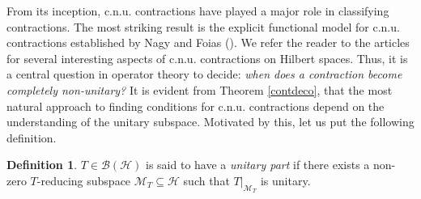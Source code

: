 \documentclass[12pt]{amsart}
\numberwithin{equation}{section}
\theoremstyle{definition}
\newtheorem*{defn*}{Definition}
\newcommand{\1}{{\mbox{\bf 1}}}
\newcommand{\clb}{\mathcal{B}}
\newcommand{\clh}{\mathcal{H}}
\newcommand{\clm}{\mathcal{M}}
\begin{document}
From its inception, c.n.u. contractions have played a major role in classifying contractions. The most striking result is the explicit functional model for c.n.u. contractions established by Nagy and Foias (\cite{NF}). We refer the reader to the articles \cite{Bercovici, BT, Das, Levan, MT, Wu} for several interesting aspects of c.n.u. contractions on Hilbert spaces.  Thus, it is a central question in operator theory to decide: \textit{when does a contraction become completely non-unitary?} It is evident from Theorem \ref{contdeco}, that the most natural approach to finding conditions for c.n.u. contractions depend on the understanding of the unitary subspace.  Motivated by this, let us put the following definition. 

\begin{defn*}
$T \in \clb(\clh)$ is said to have a \textit{unitary part} if there exists a non-zero $T$-reducing subspace $\clm_T \subseteq \clh$ such that $T|_{\clm_T}$ is unitary.
\end{defn*}
\end{document}
